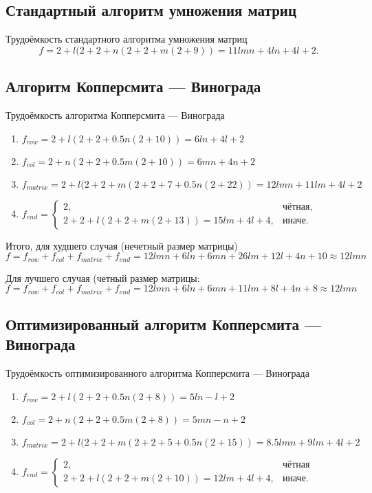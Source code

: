 \subsection{Стандартный алгоритм умножения матриц}

Трудоёмкость стандартного алгоритма умножения матриц
\begin{equation}
f = 2 + l(2 + 2 + n(2 + 2 + m(2 + 9)) = 11lmn + 4ln + 4l + 2.
\end{equation}

\subsection{Алгоритм Копперсмита — Винограда}

Трудоёмкость алгоритма Копперсмита — Винограда
\begin{enumerate}
	\item $f_{row} = 2 + l(2 + 2 + 0.5n(2 + 10)) = 6ln + 4l + 2$
	\item $f_{col} = 2 + n(2 + 2 + 0.5m(2 + 10)) = 6mn + 4n + 2$
	\item $f_{matrix} = 2 + l(2 + 2 + m(2 + 2 + 7 + 0.5n(2 + 22)) = 12lmn + 11lm + 4l + 2$
	\item $f_{end} = \begin{cases}
		2, & \text{чётная,}\\
		2 + 2 + l(2 + 2 + m(2 + 13)) = 15lm + 4l + 4, & \text{иначе.}
	\end{cases}$
\end{enumerate}

Итого, для худшего случая (нечетный размер матрицы) $f = f_{row} + f_{col} + f_{matrix} + f_{end} = 12lmn + 6ln + 6mn + 26lm + 12l + 4n + 10 \approx 12lmn$

Для лучшего случая (четный размер матрицы: $f = f_{row} + f_{col} + f_{matrix} + f_{end} = 12lmn + 6ln + 6mn + 11lm + 8l + 4n + 8 \approx 12lmn$

\subsection{Оптимизированный алгоритм Копперсмита — Винограда}

Трудоёмкость оптимизированного алгоритма Копперсмита — Винограда
\begin{enumerate}
	\item $f_{row} = 2 + l(2 + 2 + 0.5n(2 + 8)) = 5ln - l + 2$
	\item $f_{col} = 2 + n(2 + 2 + 0.5m(2 + 8)) = 5mn - n + 2$
	\item $f_{matrix} = 2 + l(2 + 2 + m(2 + 2 + 5 + 0.5n(2 + 15)) = 8.5lmn + 9lm + 4l + 2$
	\item $f_{end} = \begin{cases}
		2, & \text{чётная}\\
		2 + 2 + l(2 + 2 + m(2 + 10)) = 12lm + 4l + 4, & \text{иначе.}
	\end{cases}$
\end{enumerate}

